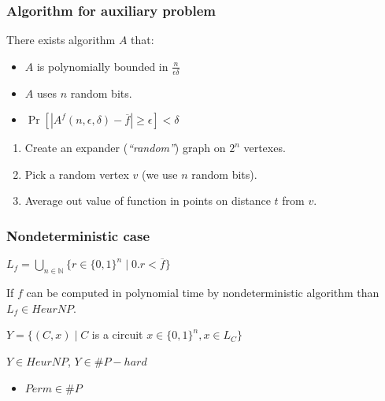 \begin{frame}
    \frametitle{Algorithm for auxiliary problem}

    \begin{statement}
        There exists algorithm $A$ that:
        \begin{itemize}
	        \item $A$ is polynomially bounded in $\frac{n}{\epsilon\delta}$
        	\item $A$ uses $n$ random bits.
        	\item $\Pr[|A^{f}(n, \epsilon, \delta) - \overline{f}| \ge \epsilon] <
		        \delta$
        \end{itemize}
    \end{statement}

    \begin{enumerate}
 		\item Create an expander ({\it ``random''}) graph on $2^n$ vertexes.
    	\item Pick a random vertex $v$ (we use $n$ random bits).
    	\item Average out value of function in points on distance $t$ from $v$.
    \end{enumerate}
    
\end{frame}

\begin{frame}
    \frametitle{Nondeterministic case}

    $L_f = \bigcup\limits_{n \in \mathbb{N}}\{r \in \{0, 1\}^n \mid 0.r <
    \overline{f}\}$

    \begin{lemma}
        If $f$ can be computed in polynomial time by nondeterministic algorithm than
        $L_f \in HeurNP$.
    \end{lemma}
    
	$Y = \{(C, x) \mid C$ is a circuit $x \in \{0, 1\}^n, x \in L_{C}\}$
    
    \begin{lemma}
        $Y \in HeurNP$, $Y \in \#P-hard$
    \end{lemma}

    \begin{itemize}
	    \item $Perm \in \#P$
    \end{itemize}
    
\end{frame}

